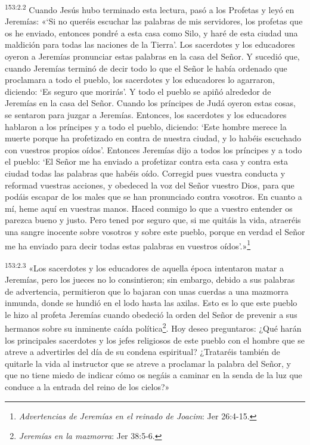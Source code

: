 \par
\textsuperscript{153:2.2} Cuando Jesús hubo terminado esta lectura, pasó a los Profetas y leyó en Jeremías: «`Si no queréis escuchar las palabras de mis servidores, los profetas que os he enviado, entonces pondré a esta casa como Silo, y haré de esta ciudad una maldición para todas las naciones de la Tierra'. Los sacerdotes y los educadores oyeron a Jeremías pronunciar estas palabras en la casa del Señor. Y sucedió que, cuando Jeremías terminó de decir todo lo que el Señor le había ordenado que proclamara a todo el pueblo, los sacerdotes y los educadores lo agarraron, diciendo: `Es seguro que morirás'. Y todo el pueblo se apiñó alrededor de Jeremías en la casa del Señor. Cuando los príncipes de Judá oyeron estas cosas, se sentaron para juzgar a Jeremías. Entonces, los sacerdotes y los educadores hablaron a los príncipes y a todo el pueblo, diciendo: `Este hombre merece la muerte porque ha profetizado en contra de nuestra ciudad, y lo habéis escuchado con vuestros propios oídos'. Entonces Jeremías dijo a todos los príncipes y a todo el pueblo: `El Señor me ha enviado a profetizar contra esta casa y contra esta ciudad todas las palabras que habéis oído. Corregid pues vuestra conducta y reformad vuestras acciones, y obedeced la voz del Señor vuestro Dios, para que podáis escapar de los males que se han pronunciado contra vosotros. En cuanto a mí, heme aquí en vuestras manos. Haced conmigo lo que a vuestro entender os parezca bueno y justo. Pero tened por seguro que, si me quitáis la vida, atraeréis una sangre inocente sobre vosotros y sobre este pueblo, porque en verdad el Señor me ha enviado para decir todas estas palabras en vuestros oídos'.»\footnote{\textit{Advertencias de Jeremías en el reinado de Joacim}: Jer 26:4-15.}

\par
\textsuperscript{153:2.3} «Los sacerdotes y los educadores de aquella época intentaron matar a Jeremías, pero los jueces no lo consintieron; sin embargo, debido a sus palabras de advertencia, permitieron que lo bajaran con unas cuerdas a una mazmorra inmunda, donde se hundió en el lodo hasta las axilas. Esto es lo que este pueblo le hizo al profeta Jeremías cuando obedeció la orden del Señor de prevenir a sus hermanos sobre su inminente caída política\footnote{\textit{Jeremías en la mazmorra}: Jer 38:5-6.}. Hoy deseo preguntaros: ¿Qué harán los principales sacerdotes y los jefes religiosos de este pueblo con el hombre que se atreve a advertirles del día de su condena espiritual? ¿Trataréis también de quitarle la vida al instructor que se atreve a proclamar la palabra del Señor, y que no tiene miedo de indicar cómo os negáis a caminar en la senda de la luz que conduce a la entrada del reino de los cielos?»

